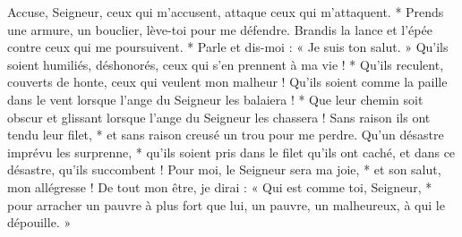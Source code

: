 Accuse, Seigneur, ceux qui m'accusent, attaque ceux qui m'attaquent. *
\versseparator
Prends une armure, un bouclier, lève-toi pour me défendre.
\versseparator
Brandis la lance et l'épée contre ceux qui me poursuivent. * Parle et dis-moi : « Je suis ton salut. »
\versseparator
Qu'ils soient humiliés, déshonorés, ceux qui s'en prennent à ma vie ! * Qu'ils reculent, couverts de honte, ceux qui veulent mon malheur !
\versseparator
Qu'ils soient comme la paille dans le vent lorsque l'ange du Seigneur les balaiera ! *
\versseparator
Que leur chemin soit obscur et glissant lorsque l'ange du Seigneur les chassera !
\versseparator
Sans raison ils ont tendu leur filet, * et sans raison creusé un trou pour me perdre.
\versseparator
Qu'un désastre imprévu les surprenne, * qu'ils soient pris dans le filet qu'ils ont caché, et dans ce désastre, qu'ils succombent !
\versseparator
Pour moi, le Seigneur sera ma joie, * et son salut, mon allégresse !
\versseparator
De tout mon être, je dirai : « Qui est comme toi, Seigneur, * pour arracher un pauvre à plus fort que lui, un pauvre, un malheureux, à qui le dépouille. »
